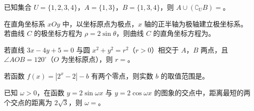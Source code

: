 \begin{question}
已知集合 \(U=\{1,2,3,4\}\)，\(A=\{1,3\}\)，\(B=\{1,3,4\}\)，则 \(A\cup(\complement_U B)=\)\gkblank{}。

\end{question}
\begin{question}
在直角坐标系 \(xOy\) 中，以坐标原点为极点，\(x\) 轴的正半轴为极轴建立极坐标系。若曲线 \(C\) 的极坐标方程为 \(\rho=2\sin\theta\)，则曲线 \(C\) 的直角坐标方程为\gkblank{}。

\end{question}
\begin{question}
若直线 \(3x-4y+5=0\) 与圆 \(x^2+y^2=r^2\)（\(r>0\)）相交于 \(A\)，\(B\) 两点，且 \(\angle AOB=120^\circ\)（\(O\) 为坐标原点），则 \(r=\)\gkblank{}。

\end{question}
\begin{question}
若函数 \(f(x)=|2^x-2|-b\) 有两个零点，则实数 \(b\) 的取值范围是\gkblank{}。

\end{question}
\begin{question}
已知 \(\omega>0\)，在函数 \(y=2\sin\omega x\) 与 \(y=2\cos\omega x\) 的图象的交点中，距离最短的两个交点的距离为 \(2\sqrt3\)，则 \(\omega=\)\gkblank{}。

\end{question}

